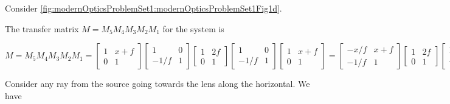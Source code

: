 {\begin{enumerate}
Consider \cref{fig:modernOpticsProblemSet1:modernOpticsProblemSet1Fig1d}.


The transfer matrix $M = M_5 M_4 M_3 M_2 M_1$ for the system is

\begin{dmath}\label{eqn:modernOpticsProblemSet1P1:1670}
M
= M_5 M_4 M_3 M_2 M_1
=
\begin{bmatrix}
1 & x + f \\
0 & 1
\end{bmatrix}
\begin{bmatrix}
1 & 0 \\
-1/f & 1
\end{bmatrix}
\begin{bmatrix}
1 & 2 f \\
0 & 1
\end{bmatrix}
\begin{bmatrix}
1 & 0 \\
-1/f & 1
\end{bmatrix}
\begin{bmatrix}
1 & x + f \\
0 & 1
\end{bmatrix}
=
\begin{bmatrix}
-x/f & x + f \\
-1/f & 1
\end{bmatrix}
\begin{bmatrix}
1 & 2 f \\
0 & 1
\end{bmatrix}
\begin{bmatrix}
1 & x + f \\
-1/f & -x/f
\end{bmatrix}
=
\begin{bmatrix}
-x/f & -x + f \\
-1/f & -1
\end{bmatrix}
\begin{bmatrix}
1 & x + f \\
-1/f & -x/f
\end{bmatrix}
=
\begin{bmatrix}
-1 & -2 x \\
0 & -1
\end{bmatrix}.
\end{dmath}

Consider any ray from the source going towards the lens along the horizontal.  We have


\end{enumerate}}
